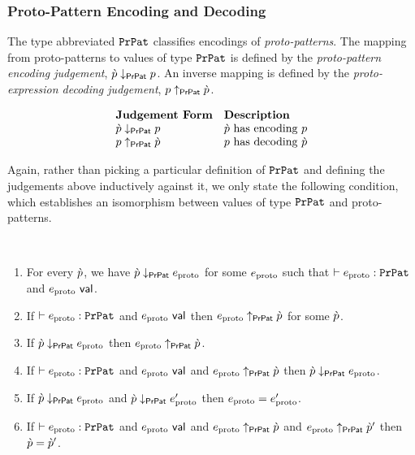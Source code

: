 \begin{grayparbox}\vspace{-16px}
\subsubsection{Proto-Pattern Encoding and Decoding}
The type abbreviated $\mathtt{PrPat}$ classifies encodings of \emph{proto-patterns}. The mapping from proto-patterns to values of type $\mathtt{PrPat}$ is defined by the \emph{proto-pattern encoding judgement}, $\grave{p} \downarrow_\mathsf{PrPat} p$. An inverse mapping is defined by the \emph{proto-expression decoding judgement}, $p \uparrow_\mathsf{PrPat} \grave{p}$.

\[\begin{array}{ll}
\textbf{Judgement Form} & \textbf{Description}\\
\grave{p} \downarrow_\mathsf{PrPat} p & \text{$\grave{p}$ has encoding $p$}\\
p \uparrow_\mathsf{PrPat} \grave{p} & \text{$p$ has decoding $\grave{p}$}
\end{array}\]

Again, rather than picking a particular definition of $\mathtt{PrPat}$ and defining the judgements above inductively against it, we only state the following condition, which establishes an isomorphism between values of type $\mathtt{PrPat}$ and proto-patterns.

\begin{condition}\label{condition:proto-pattern-isomorphism} ~
\begin{enumerate}
\item For every $\grave{p}$, we have $\grave{p} \downarrow_\mathsf{PrPat} e_\text{proto}$ for some $e_\text{proto}$ such that $\vdash e_\text{proto} : \mathtt{PrPat}$ and $e_\text{proto}~\mathsf{val}$.
\item If $\vdash e_\text{proto} : \mathtt{PrPat}$ and $e_\text{proto}~\mathsf{val}$ then $e_\text{proto} \uparrow_\mathsf{PrPat} \grave{p}$ for some $\grave{p}$.
\item If $\grave{p} \downarrow_\mathsf{PrPat} e_\text{proto}$ then $e_\text{proto} \uparrow_\mathsf{PrPat} \grave{p}$.
\item If $\vdash e_\text{proto} : \mathtt{PrPat}$ and $e_\text{proto}~\mathsf{val}$ and $e_\text{proto} \uparrow_\mathsf{PrPat} \grave{p}$ then $\grave{p} \downarrow_\mathsf{PrPat} e_\text{proto}$.
\item If $\grave{p} \downarrow_\mathsf{PrPat} e_\text{proto}$ and $\grave{p} \downarrow_\mathsf{PrPat} e_\text{proto}'$ then $e_\text{proto}=e_\text{proto}'$.
\item If $\vdash e_\text{proto} : \mathtt{PrPat}$ and $e_\text{proto}~\mathsf{val}$ and $e_\text{proto} \uparrow_\mathsf{PrPat} \grave{p}$ and $e_\text{proto} \uparrow_\mathsf{PrPat} \grave{p}'$ then $\grave{p}=\grave{p}'$.
\end{enumerate}
\end{condition}
\end{grayparbox}

